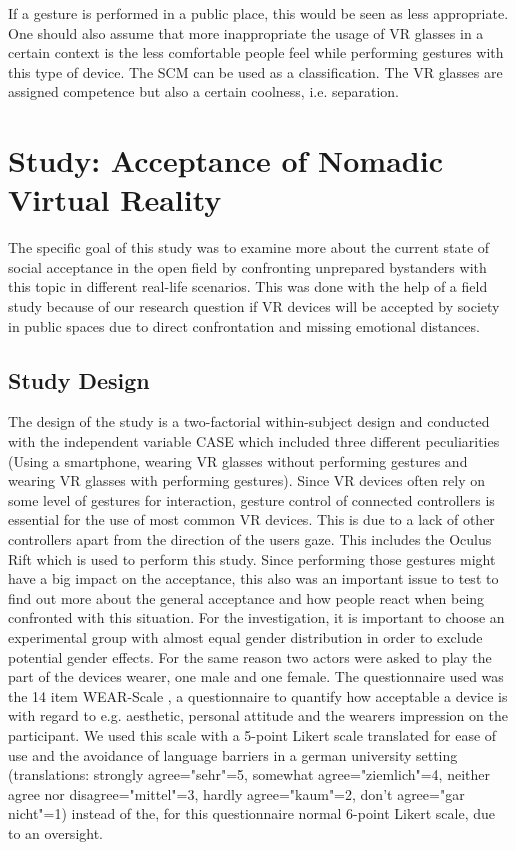 \documentclass[sigchi]{acmart}
\begin{document}
If a gesture is performed in a public place, this would be seen as less appropriate. One should also assume that more inappropriate the usage of VR glasses in a certain context is the less comfortable people feel while performing gestures with this type of device. The SCM can be used as a classification. The VR glasses are assigned competence but also a certain coolness, i.e. separation.



\section{Study: Acceptance of Nomadic Virtual Reality}
The specific goal of this study was to examine more about the current state of social acceptance in the open field by confronting unprepared bystanders with this topic in different real-life scenarios. This was done with the help of a field study because of our research question if VR devices will be accepted by society in public spaces due to direct confrontation and missing emotional distances.

\subsection{Study Design}

The design of the study is a two-factorial within-subject design and conducted with the independent variable CASE which included three different peculiarities (Using a smartphone, wearing VR glasses without performing gestures and wearing VR glasses with performing gestures). Since VR devices often rely on some level of gestures for interaction, gesture control of connected controllers is essential for the use of most common VR devices. This is due to a lack of other controllers apart from the direction of the users gaze. This includes the Oculus Rift which is used to perform this study. Since performing those gestures might have a big impact on the acceptance, this also was an important issue to test to find out more about the general acceptance and how people react when being confronted with this situation. For the investigation, it is important to choose an experimental group with almost equal gender distribution in order to exclude potential gender effects. For the same reason two actors were asked to play the part of the devices wearer, one male and one female.
The questionnaire used was the 14 item WEAR-Scale \cite{kelly2016wear}, a questionnaire to quantify how acceptable a device is with regard to e.g. aesthetic, personal attitude and the wearers impression on the participant. We used this scale with a 5-point Likert scale translated for ease of use and the avoidance of language barriers in a german university setting (translations: strongly agree="sehr"=5, somewhat agree="ziemlich"=4, neither agree nor disagree="mittel"=3, hardly agree="kaum"=2, don't agree="gar nicht"=1) instead of the, for this questionnaire normal 6-point Likert scale, due to an oversight.
\end{document}
